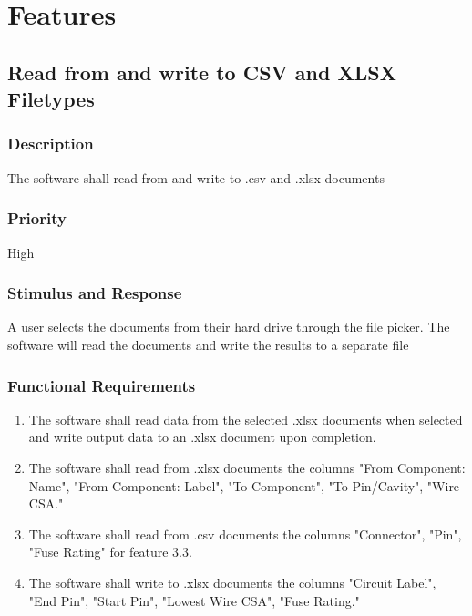 \section{Features}

\subsection{Read from and write to CSV and XLSX Filetypes}
\subsubsection{Description}
The software shall read from and write to .csv and .xlsx documents

\subsubsection{Priority}
High 

\subsubsection{Stimulus and Response}
 A user selects the documents from their hard drive through the file picker. The software will read the documents and write the results to a separate file

\subsubsection{Functional Requirements}

\begin{enumerate}


 
\item  The software shall read data from the selected .xlsx documents when selected
 and write output data to an .xlsx document upon completion.


 \item The software shall read from .xlsx documents the columns "From Component: Name", "From Component: Label", "To Component", "To Pin/Cavity", "Wire CSA."

 \item The software shall read from .csv documents the columns "Connector", "Pin", "Fuse Rating" for feature 3.3.

 \item The software shall write to .xlsx documents the columns "Circuit Label", "End Pin", "Start Pin", "Lowest Wire CSA", "Fuse Rating."
 \end{enumerate}
 
